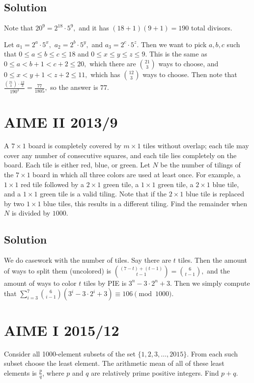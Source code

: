 \documentclass[blue,onecol]{shooting}
\begin{document}
\subsection{Solution}
Note that $20^9=2^{18}\cdot 5^9,$ and it has $(18+1)(9+1)=190$ total divisors.
    
Let $a_1=2^a\cdot 5^x,$ $a_2=2^b\cdot 5^y,$ and $a_3=2^c\cdot 5^z.$ Then we want to pick $a,b,c$ such that $0\leq a\leq b\leq c\leq 18$ and $0\leq x\leq y\leq z\leq 9.$ This is the same as $0\leq a<b+1<c+2\leq 20,$ which there are $\binom{21}{3}$ ways to choose, and $0\leq x<y+1<z+2\leq 11,$ which has $\binom{12}{3}$ ways to choose. Then note that $\frac{\binom{21}{3}\cdot\frac{12}{3}}{190^3}=\frac{77}{1805},$ so the answer is $77.$

\section{AIME II 2013/9}
A $7\times 1$ board is completely covered by $m\times 1$ tiles without overlap; each tile may cover any number of consecutive squares, and each tile lies completely on the board. Each tile is either red, blue, or green. Let $N$ be the number of tilings of the $7\times 1$ board in which all three colors are used at least once. For example, a $1\times 1$ red tile followed by a $2\times 1$ green tile, a $1\times 1$ green tile, a $2\times 1$ blue tile, and a $1\times 1$ green tile is a valid tiling. Note that if the $2\times 1$ blue tile is replaced by two $1\times 1$ blue tiles, this results in a different tiling. Find the remainder when $N$ is divided by $1000$.

\subsection{Solution}
We do casework with the number of tiles. Say there are $t$ tiles. Then the amount of ways to split them (uncolored) is $\binom{(7-t)+(t-1)}{t-1}=\binom{6}{t-1},$ and the amount of ways to color $t$ tiles by PIE is $3^n-3\cdot 2^n+3.$ Then we simply compute that $\sum_{i=3}^{7}\binom{6}{i-1}(3^i-3\cdot 2^i+3)\equiv 106\pmod{1000}.$

\section{AIME I 2015/12}
Consider all 1000-element subsets of the set $\{1, 2, 3,\ldots,2015\}.$ From each such subset choose the least element. The arithmetic mean of all of these least elements is $\frac{p}{q}$, where $p$ and $q$ are relatively prime positive integers. Find $p + q$.
\end{document}
